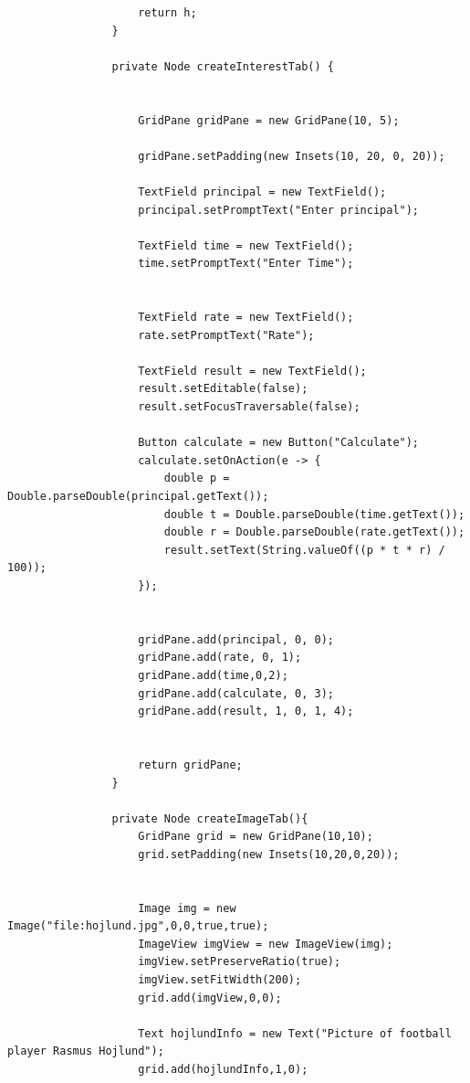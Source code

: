 \documentclass{book}
\begin{document}
{\begin{enumerate}
\begin{verbatim}
                    return h;
                }

                private Node createInterestTab() {


                    GridPane gridPane = new GridPane(10, 5);

                    gridPane.setPadding(new Insets(10, 20, 0, 20));

                    TextField principal = new TextField();
                    principal.setPromptText("Enter principal");

                    TextField time = new TextField();
                    time.setPromptText("Enter Time");


                    TextField rate = new TextField();
                    rate.setPromptText("Rate");

                    TextField result = new TextField();
                    result.setEditable(false);
                    result.setFocusTraversable(false);

                    Button calculate = new Button("Calculate");
                    calculate.setOnAction(e -> {
                        double p = Double.parseDouble(principal.getText());
                        double t = Double.parseDouble(time.getText());
                        double r = Double.parseDouble(rate.getText());
                        result.setText(String.valueOf((p * t * r) / 100));
                    });


                    gridPane.add(principal, 0, 0);
                    gridPane.add(rate, 0, 1);
                    gridPane.add(time,0,2);
                    gridPane.add(calculate, 0, 3);
                    gridPane.add(result, 1, 0, 1, 4);


                    return gridPane;
                }

                private Node createImageTab(){
                    GridPane grid = new GridPane(10,10);
                    grid.setPadding(new Insets(10,20,0,20));


                    Image img = new Image("file:hojlund.jpg",0,0,true,true);
                    ImageView imgView = new ImageView(img);
                    imgView.setPreserveRatio(true);
                    imgView.setFitWidth(200);
                    grid.add(imgView,0,0);

                    Text hojlundInfo = new Text("Picture of football player Rasmus Hojlund");
                    grid.add(hojlundInfo,1,0);


\end{verbatim}
\end{enumerate}}
\end{document}
